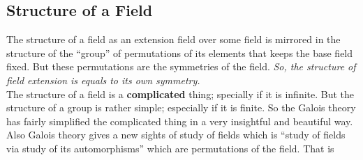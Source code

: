 \subsection{Structure of a Field}
The structure of a field as an extension field over some field is mirrored in the structure of the ``group'' of  permutations of its elements that keeps the base field fixed. But these permutations are the symmetries of the field. \textit{So, the structure of field extension is equals to its own symmetry.}\\

The structure of a field is a \textbf{complicated} thing; specially if it is infinite. But the structure of a group is rather simple; especially if it is finite. So the Galois theory has fairly simplified the complicated thing in a very insightful and beautiful way.\\

Also Galois theory gives a new sights of study of fields which is ``study of fields via study of its automorphisms'' which are permutations of the field. That is\\[5mm]

